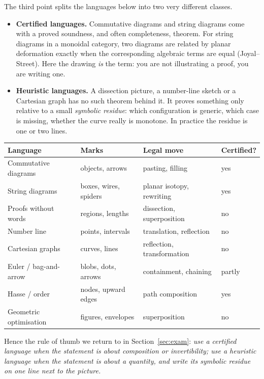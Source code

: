 The third point splits the languages below into two very different classes.

\begin{itemize}
\item \textbf{Certified languages.} Commutative diagrams and string diagrams come with a
  proved soundness, and often completeness, theorem. For string diagrams in a monoidal
  category, two diagrams are related by planar deformation exactly when the corresponding
  algebraic terms are equal (Joyal--Street). Here the drawing \emph{is} the term: you are
  not illustrating a proof, you are writing one.
\item \textbf{Heuristic languages.} A dissection picture, a number-line sketch or a
  Cartesian graph has no such theorem behind it. It proves something only relative to a
  small \emph{symbolic residue}: which configuration is generic, which case is missing,
  whether the curve really is monotone. In practice the residue is one or two lines.
\end{itemize}

\begin{center}
\small
\begin{tabular}{@{}llll@{}}
\toprule
Language & Marks & Legal move & Certified? \\
\midrule
Commutative diagrams   & objects, arrows        & pasting, filling & yes \\
String diagrams        & boxes, wires, spiders  & planar isotopy, rewriting & yes \\
Proofs without words   & regions, lengths       & dissection, superposition & no \\
Number line            & points, intervals      & translation, reflection & no \\
Cartesian graphs       & curves, lines          & reflection, transformation & no \\
Euler / bag-and-arrow  & blobs, dots, arrows    & containment, chaining & partly \\
Hasse / order          & nodes, upward edges    & path composition & yes \\
Geometric optimisation & figures, envelopes     & superposition & no \\
\bottomrule
\end{tabular}
\end{center}

\medskip
\noindent
Hence the rule of thumb we return to in Section~\ref{sec:exam}: \emph{use a certified
language when the statement is about composition or invertibility; use a heuristic
language when the statement is about a quantity, and write its symbolic residue on one
line next to the picture.}
